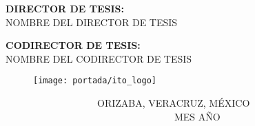 \begin{titlepage}
    \vspace{1\baselineskip}
    \begin{center}
        \fontsize{11}{12}\selectfont \textbf{DIRECTOR DE TESIS:} \\
        \fontsize{12}{12}\selectfont NOMBRE DEL DIRECTOR DE TESIS %
    \end{center}

    \vspace{1\baselineskip}
    \begin{center}
        \fontsize{11}{12}\selectfont \textbf{CODIRECTOR DE TESIS:} \\
        \fontsize{12}{12}\selectfont NOMBRE DEL CODIRECTOR DE TESIS %
    \end{center}

    \begin{figure}[H]
        \texttt{[image: portada/ito\_logo]}
    \end{figure}

    \vspace{1\baselineskip}
    \begin{flushleft}
        \fontsize{11}{12}\selectfont \ \ \ \ \ \ \ \ \ \ \ \ \ \ \ \ \ \ \ ORIZABA, VERACRUZ, MÉXICO \ \ \ \ \ \ \ \ \ \ \ \ \ \ \ \ \ \ \ \ \ \ \ \ \ \ \ \ \ \ \ \ \ \ \ MES AÑO %
    \end{flushleft}
\end{titlepage}
